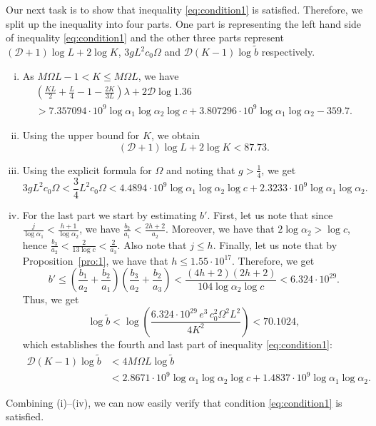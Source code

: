 \documentclass{amsart}
\theoremstyle{definition}
\begin{document}
Our next task is to show that inequality \eqref{eq:condition1} is satisfied. Therefore, we split up the inequality into four parts.
One part is representing the left hand side of inequality \eqref{eq:condition1} and the other three parts represent $(\mathcal{D}+1) \log L+ 2\log K$,
$3gL^2c_0\Omega$ and $\mathcal{D}(K-1)\log \tilde{b}$ respectively.
\begin{enumerate}[(i)]
 \item As $M\Omega L-1<K\le M\Omega L$, we have 
 \begin{multline*}
\left(\frac{KL}{2}+ \frac{L}{4}-1 - \frac{2K}{3L}\right)\lambda + 2 \mathcal{D} \log 1.36 \\
>7.357094\cdot 10^{9} \log \alpha_1\log \alpha_2 \log c +3.807296\cdot 10^9\log \alpha_1\log \alpha_2 -359.7. 
\end{multline*}

\item Using the upper bound for $K$, we obtain
$$(\mathcal{D}+1) \log L+ 2\log K< 87.73.$$

\item Using the explicit formula for $\Omega$ and noting that $g>\frac 14$, we get
$$3gL^2c_0\Omega < \frac{3}{4}L^2c_0\Omega < 4.4894\cdot 10^9 \log \alpha_1\log \alpha_2 \log c +2.3233\cdot 10^9 \log \alpha_1\log \alpha_2.$$

\item For the last part we start by estimating $b'$. First, let us note that since $\frac{j}{\log \alpha_1}<\frac{h+1}{\log \alpha_2}$, 
we have $\frac{b_2}{a_1}<\frac{2h+2}{a_2}$. Moreover, we have that $2\log\alpha_2>\log c$, hence  $\frac{b_3}{a_2}<\frac{2}{13 \log c}<\frac{2}{a_3}$.
Also note that $j\leq h$. Finally, let us note that by Proposition~\ref{pro:1}, we have that $h \le 1.55\cdot 10^{17}$. Therefore, we get
$$
 b'\le \left(\frac{b_1}{a_2}+\frac{b_2}{a_1}\right)\left(\frac{b_3}{a_2}+\frac{b_2}{a_3}\right)
 <\frac{(4h+2)(2h+2)}{104\log\alpha_2\log c}< 6.324\cdot 10^{29}.  
$$
Thus, we get 
$$
\log \tilde{b} < \log\left(\frac{6.324\cdot 10^{29}\, e^3\, c_0^2\Omega^2 L^2}{4K^2}\right)<70.1024,
$$
which establishes the fourth and last part of inequality \eqref{eq:condition1}: 
\begin{align*}
\mathcal{D}(K-1)\log \tilde{b}& <4M\Omega L \log \tilde{b}\\
& <2.8671\cdot 10^9\log \alpha_1 \log \alpha_2 \log c +1.4837\cdot 10^9\log \alpha_1 \log \alpha_2.
\end{align*}
\end{enumerate}
Combining (i)--(iv), we can now easily verify that condition \eqref{eq:condition1} is satisfied.
\end{document}
